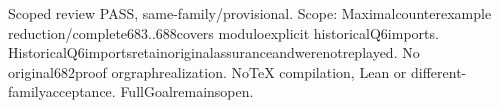 \documentclass{article}
\begin{document}
Scoped review PASS, same-family/provisional. Scope: Maximalcounterexample reduction/complete683..688covers moduloexplicit historicalQ6imports. HistoricalQ6importsretainoriginalassuranceandwerenotreplayed. No original682proof orgraphrealization. NoTeX compilation, Lean or different-familyacceptance. FullGoalremainsopen.
\end{document}

